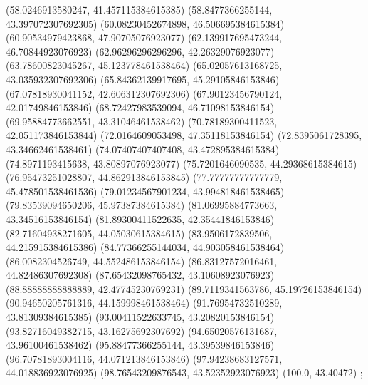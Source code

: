 {{{		(58.0246913580247, 41.457115384615385)
		(58.8477366255144, 43.397072307692305)
		(60.08230452674898, 46.506695384615384)
		(60.90534979423868, 47.90705076923077)
		(62.139917695473244, 46.70844923076923)
		(62.96296296296296, 42.26329076923077)
		(63.78600823045267, 45.123778461538464)
		(65.02057613168725, 43.035932307692306)
		(65.84362139917695, 45.29105846153846)
		(67.07818930041152, 42.606312307692306)
		(67.90123456790124, 42.01749846153846)
		(68.72427983539094, 46.71098153846154)
		(69.95884773662551, 43.31046461538462)
		(70.78189300411523, 42.051173846153844)
		(72.0164609053498, 47.35118153846154)
		(72.8395061728395, 43.34662461538461)
		(74.07407407407408, 43.472895384615384)
		(74.8971193415638, 43.80897076923077)
		(75.7201646090535, 44.29368615384615)
		(76.95473251028807, 44.862913846153845)
		(77.77777777777779, 45.478501538461536)
		(79.01234567901234, 43.994818461538465)
		(79.83539094650206, 45.97387384615384)
		(81.06995884773663, 43.34516153846154)
		(81.89300411522635, 42.35441846153846)
		(82.71604938271605, 44.05030615384615)
		(83.9506172839506, 44.215915384615386)
		(84.77366255144034, 44.903058461538464)
		(86.0082304526749, 44.552486153846154)
		(86.83127572016461, 44.82486307692308)
		(87.65432098765432, 43.10608923076923)
		(88.88888888888889, 42.47745230769231)
		(89.7119341563786, 45.19726153846154)
		(90.94650205761316, 44.159998461538464)
		(91.76954732510289, 43.81309384615385)
		(93.00411522633745, 43.20820153846154)
		(93.82716049382715, 43.16275692307692)
		(94.65020576131687, 43.96100461538462)
		(95.88477366255144, 43.39539846153846)
		(96.70781893004116, 44.071213846153846)
		(97.94238683127571, 44.018836923076925)
		(98.76543209876543, 43.52352923076923)
		(100.0, 43.40472)
	};

}}
